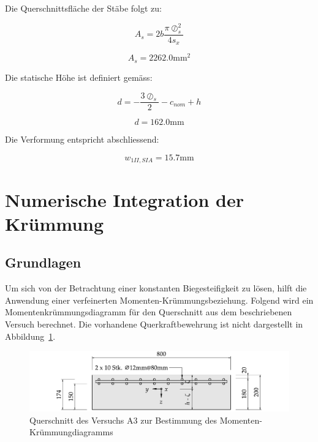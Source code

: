\documentclass[
  letterpaper,
]{scrreprt}
\begin{document}
Die Querschnittsfläche der Stäbe folgt zu:

\begin{equation}A_{s} = 2 b \frac{\pi \oslash_{s}^{2}}{4 s_{x}}\end{equation}

\begin{equation}A_{s} = 2262.0 \text{mm}^{2}\end{equation}

Die statische Höhe ist definiert gemäss:

\begin{equation}d = - \frac{3 \oslash_{s}}{2} - c_{nom} + h\end{equation}

\begin{equation}d = 162.0 \text{mm}\end{equation}

Die Verformung entspricht abschliessend:

\begin{equation}w_{1 II,SIA} = 15.7 \text{mm}\end{equation}

\hypertarget{numerische-integration-der-kruxfcmmung-1}{%
\section{Numerische Integration der
Krümmung}\label{numerische-integration-der-kruxfcmmung-1}}

\hypertarget{grundlagen}{%
\subsection{Grundlagen}\label{grundlagen}}

Um sich von der Betrachtung einer konstanten Biegesteifigkeit zu lösen,
hilft die Anwendung einer verfeinerten Momenten-Krümmungsbeziehung.
Folgend wird ein Momentenkrümmungsdiagramm für den Querschnitt aus dem
beschriebenen Versuch berechnet. Die vorhandene Querkraftbewehrung ist
nicht dargestellt in Abbildung~\ref{fig-qs_a3}.

\begin{figure}[H]

{\centering \includegraphics{index_files/mediabag/../images/QS_Versuch_A3.pdf}

}

\caption{\label{fig-qs_a3}Querschnitt des Versuchs A3 zur Bestimmung des
Momenten-Krümmungdiagramms}

\end{figure}
\end{document}
